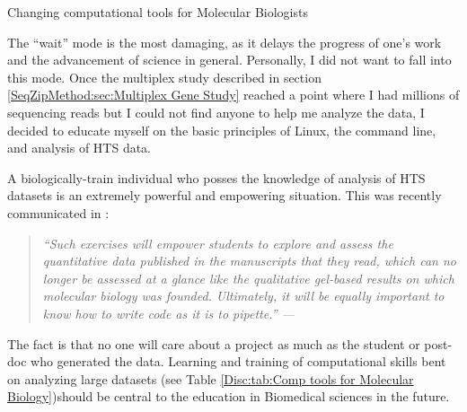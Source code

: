     \begin{table} %
      \caption[Changing computational tools for Molecular Biologists] 
        {
         Changing computational tools for Molecular Biologists
         }
       \label{Disc:tab:Comp tools for Molecular Biology}
       
       \end{table}

    The ``wait'' mode is the most damaging, as it delays the progress of one's work and the advancement of science in general. Personally, I did not want to fall into this mode. Once the multiplex study described in section \ref{SeqZipMethod:sec:Multiplex Gene Study} reached a point where I had millions of sequencing reads but I could not find anyone to help me analyze the data, I decided to educate myself on the basic principles of Linux, the command line, and analysis of HTS data.

    A biologically-train individual who posses the knowledge of analysis of HTS datasets is an extremely powerful and empowering situation. This was recently communicated in \citet{Plocik2013}:

    \begin{quote} %
      \itshape 
      ``Such exercises will empower students to explore and assess the quantitative data published in the manuscripts that they read, which can no longer be assessed at a glance like the qualitative gel-based results on which molecular biology was founded. Ultimately, it will be equally important to know how to write code as it is to pipette.'' --- \citep{Plocik2013}
      \singlespacing
      \end{quote}

    The fact is that no one will care about a project as much as the student or post-doc who generated the data. Learning and training of computational skills bent on analyzing large datasets (see Table \ref{Disc:tab:Comp tools for Molecular Biology})should be central to the education in Biomedical sciences in the future.

\cleardoublepage